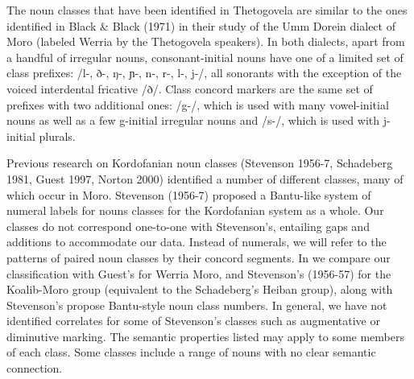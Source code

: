 The noun classes that have been identified in Thetogovela are similar to the ones identified in Black \& Black (1971) in their study of the Umm Dorein dialect of Moro (labeled Werria by the Thetogovela speakers). In both dialects, apart from a handful of irregular nouns, consonant-initial nouns have one of a limited set of class prefixes: /l-, ð-, ŋ-, ɲ-, n-, r-, l-, j-/, all sonorants with the exception of the voiced interdental fricative /ð/. Class concord markers are the same set of prefixes with two additional ones: /g-/, which is used with many vowel-initial nouns as well as a few g-initial irregular nouns and /s-/, which is used with j-initial plurals. 


Previous research on Kordofanian noun classes (Stevenson 1956-7, Schadeberg 1981, Guest 1997, Norton 2000) identified a number of different classes, many of which occur in Moro. Stevenson (1956-7) proposed a Bantu-like system of numeral labels for nouns classes for the Kordofanian system as a whole. Our classes do not correspond one-to-one with Stevenson’s, entailing gaps and additions to accommodate our data. Instead of numerals, we will refer to the patterns of paired noun classes by their concord segments.  In   we compare our classification with Guest’s for Werria Moro, and Stevenson’s (1956-57) for the Koalib-Moro group (equivalent to the Schadeberg’s Heiban group), along with Stevenson's propose Bantu-style noun class numbers. In general, we have not identified correlates for some of Stevenson's classes such as augmentative or diminutive marking. The semantic properties listed may apply to some members of each class. Some classes include a range of nouns with no clear semantic connection.

